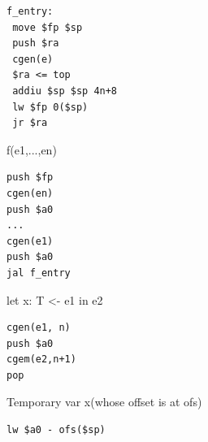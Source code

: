 \documentclass[a4paper]{exam}
\theoremstyle{definition}
\begin{document}
\begin{lrbox}{\myboxd}\begin{minipage}[t]{1.5in}
  \begin{verbatim}
f_entry:
 move $fp $sp
 push $ra
 cgen(e)
 $ra <= top
 addiu $sp $sp 4n+8
 lw $fp 0($sp)
 jr $ra
  \end{verbatim}
\end{minipage}\end{lrbox}

\begin{lrbox}{\myboe}\begin{minipage}[t]{1in}
f(e1,...,en)
\end{minipage}\end{lrbox}


\begin{lrbox}{\myboxe}\begin{minipage}[t]{1.5in}
  \begin{verbatim}
push $fp
cgen(en)
push $a0
...
cgen(e1)
push $a0
jal f_entry
  \end{verbatim}
\end{minipage}\end{lrbox}
\begin{lrbox}{\mybof}\begin{minipage}[t]{1in}
let x: T <- e1 in e2
\end{minipage}\end{lrbox}


\begin{lrbox}{\myboxf}\begin{minipage}[t]{1.5in}
  \begin{verbatim}
cgen(e1, n)
push $a0
cgem(e2,n+1)
pop
  \end{verbatim}
\end{minipage}\end{lrbox}
\begin{lrbox}{\mybog}\begin{minipage}[t]{1in}
Temporary var x(whose offset is at ofs)
\end{minipage}\end{lrbox}


\begin{lrbox}{\myboxg}\begin{minipage}[t]{1.5in}
  \begin{verbatim}
lw $a0 - ofs($sp)
  \end{verbatim}
\end{minipage}\end{lrbox}

\maketitle
\end{document}
